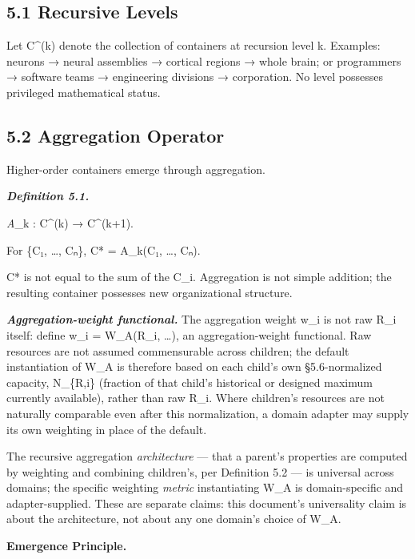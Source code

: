 \documentclass[
]{article}
\begin{document}
\hypertarget{recursive-levels}{%
\subsection{5.1 Recursive Levels}\label{recursive-levels}}

Let C\^{}(k) denote the collection of containers at recursion level k.
Examples: neurons → neural assemblies → cortical regions → whole brain;
or programmers → software teams → engineering divisions → corporation.
No level possesses privileged mathematical status.

\hypertarget{aggregation-operator}{%
\subsection{5.2 Aggregation Operator}\label{aggregation-operator}}

Higher-order containers emerge through aggregation.

\emph{\textbf{Definition 5.1.}}

\emph{A}\_k : C\^{}(k) → C\^{}(k+1).

For \{C₁, \ldots, Cₙ\}, C* = A\_k(C₁, \ldots, Cₙ).

C* is not equal to the sum of the C\_i. Aggregation is not simple
addition; the resulting container possesses new organizational
structure.

\emph{\textbf{Aggregation-weight functional.}} The aggregation weight
w\_i is not raw R\_i itself: define w\_i = W\_A(R\_i, \ldots), an
aggregation-weight functional. Raw resources are not assumed
commensurable across children; the default instantiation of W\_A is
therefore based on each child's own §5.6-normalized capacity, N\_\{R,i\}
(fraction of that child's historical or designed maximum currently
available), rather than raw R\_i. Where children's resources are not
naturally comparable even after this normalization, a domain adapter may
supply its own weighting in place of the default.

The recursive aggregation \emph{architecture} --- that a parent's
properties are computed by weighting and combining children's, per
Definition 5.2 --- is universal across domains; the specific weighting
\emph{metric} instantiating W\_A is domain-specific and
adapter-supplied. These are separate claims: this document's
universality claim is about the architecture, not about any one domain's
choice of W\_A.

\textbf{Emergence Principle.}
\end{document}
